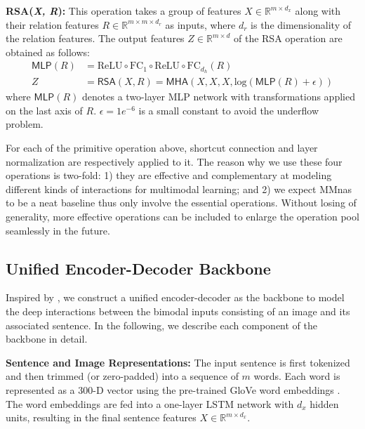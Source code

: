 \documentclass[sigconf]{acmart}
\begin{document}
\noindent\textbf{RSA(\textit{X, R}):} This operation takes a group of features $X\in\mathbb{R}^{m \times d_x}$ along with their relation features $R\in\mathbb{R}^{m\times m\times d_r} $ as inputs, where $d_r$ is the dimensionality of the relation features. The output features $Z\in\mathbb{R}^{m \times d}$ of the \textsf{RSA} operation are obtained as follows:
\begin{equation}\label{eq:rsa}
\begin{aligned}
\textsf{MLP}(R) &=\mathrm{ReLU}\circ\mathrm{FC}_{1}\circ\mathrm{ReLU}\circ\mathrm{FC}_{d_h}(R)\\
Z &= \textsf{RSA}(X, R) = \textsf{MHA}(X, X, X, \textrm{log}(\textsf{MLP}(R)+\epsilon))
\end{aligned}
\end{equation}
where $\textsf{MLP}(R)$ denotes a two-layer MLP network with transformations applied on the last axis of $R$. $\epsilon=1e^{-6}$ is a small constant to avoid the underflow problem.

For each of the primitive operation above, shortcut connection \cite{he2015deep} and layer normalization \cite{ba2016layer} are respectively applied to it. The reason why we use these four operations is two-fold: 1) they are effective and complementary at modeling different kinds of interactions for multimodal learning; and 2) we expect MMnas to be a neat baseline thus only involve the essential operations. Without losing of generality, more effective operations can be included to enlarge the operation pool seamlessly in the future.

\subsection{Unified Encoder-Decoder Backbone}\label{sec:uedb}
Inspired by \cite{yu2019mcan}, we construct a unified encoder-decoder as the backbone to model the deep interactions between the bimodal inputs consisting of an image and its associated sentence. In the following, we describe each component of the backbone in detail.

\noindent\textbf{Sentence and Image Representations:}
The input sentence is first tokenized and then trimmed (or zero-padded) into a sequence of $m$ words. Each word is represented as a 300-D vector using the pre-trained GloVe word embeddings \cite{pennington2014glove}. The word embeddings are fed into a one-layer LSTM network with $d_x$ hidden units, resulting in the final sentence features $X\in\mathbb{R}^{m\times d_x}$.
\end{document}
